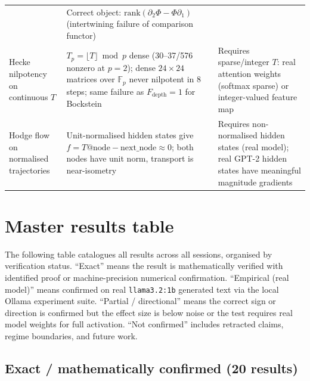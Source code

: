 \documentclass[11pt]{amsart}
\theoremstyle{definition}
\begin{document}
\begin{center}
\begin{tabularx}{\textwidth}{@{}p{3.1cm}Xp{3.2cm}@{}}
  & Correct object: $\mathrm{rank}(\partial_2\Phi - \Phi\partial_1)$
    (intertwining failure of comparison functor) \\
Hecke nilpotency on continuous $T$
  & $T_p = \lfloor T \rfloor \bmod p$ dense (30--37/576 nonzero at $p=2$);
    dense $24\times24$ matrices over $\mathbb{F}_p$ never nilpotent in 8 steps;
    same failure as $F_\mathrm{depth}=1$ for Bockstein
  & Requires sparse/integer $T$: real attention weights (softmax sparse)
    or integer-valued feature map \\
Hodge flow on normalised trajectories
  & Unit-normalised hidden states give $f = T@\mathrm{node} - \mathrm{next\_node} \approx 0$;
    both nodes have unit norm, transport is near-isometry
  & Requires non-normalised hidden states (real model);
    real GPT-2 hidden states have meaningful magnitude gradients \\
\bottomrule
\end{tabularx}
\end{center}

\section{Master results table}
\label{sec:master-table}

The following table catalogues all results across all sessions,
organised by verification status.
``Exact'' means the result is mathematically verified with
identified proof or machine-precision numerical confirmation.
``Empirical (real model)'' means confirmed on real \texttt{llama3.2:1b}
generated text via the local Ollama experiment suite.
``Partial / directional'' means the correct sign or direction
is confirmed but the effect size is below noise or the test
requires real model weights for full activation.
``Not confirmed'' includes retracted claims, regime boundaries,
and future work.

\subsection{Exact / mathematically confirmed (20 results)}
\end{document}
